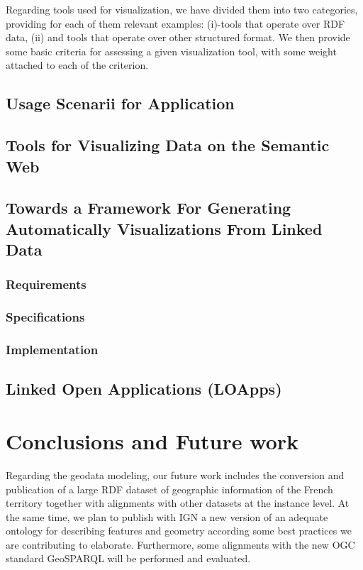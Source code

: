 \documentclass[a4paper,11pt]{report}
\begin{document}
Regarding tools used for visualization, we have divided them into two categories, providing for each of them relevant examples: (i)-tools that operate over RDF data, (ii) and tools that operate over other structured format. We then provide some basic criteria for assessing a given visualization tool, with some weight attached to each of the criterion. 

 \section{Usage Scenarii for Application}
 
 \section{Tools for Visualizing Data on the Semantic Web}
 
 \section{Towards a Framework For Generating Automatically Visualizations From Linked Data}
  
  \subsection{Requirements}
  \subsection{Specifications}
  \subsection{Implementation}
  
 \section{Linked Open Applications (LOApps)}


\chapter*{Conclusions and Future work}
Regarding the geodata modeling, our future work includes the conversion and publication of a large RDF dataset of geographic information of the French territory together with alignments with other datasets at the instance level. At the same time, we plan to publish with IGN a new version of an adequate ontology for describing features and geometry according some best practices we are contributing to elaborate. Furthermore, some alignments with the new OGC standard GeoSPARQL will be performed and evaluated.
\end{document}
